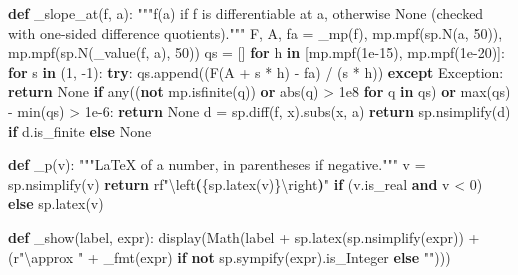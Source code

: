 \documentclass[
  letterpaper,
  DIV=11,
  numbers=noendperiod]{scrreprt}
\newenvironment{Shaded}{\begin{snugshade}}{\end{snugshade}}
\newcommand{\BuiltInTok}[1]{\textcolor[rgb]{0.00,0.23,0.31}{#1}}
\newcommand{\CharTok}[1]{\textcolor[rgb]{0.13,0.47,0.30}{#1}}
\newcommand{\CommentTok}[1]{\textcolor[rgb]{0.37,0.37,0.37}{#1}}
\newcommand{\ControlFlowTok}[1]{\textcolor[rgb]{0.00,0.23,0.31}{\textbf{#1}}}
\newcommand{\DecValTok}[1]{\textcolor[rgb]{0.68,0.00,0.00}{#1}}
\newcommand{\ErrorTok}[1]{\textcolor[rgb]{0.68,0.00,0.00}{#1}}
\newcommand{\FloatTok}[1]{\textcolor[rgb]{0.68,0.00,0.00}{#1}}
\newcommand{\KeywordTok}[1]{\textcolor[rgb]{0.00,0.23,0.31}{\textbf{#1}}}
\newcommand{\NormalTok}[1]{\textcolor[rgb]{0.00,0.23,0.31}{#1}}
\newcommand{\OperatorTok}[1]{\textcolor[rgb]{0.37,0.37,0.37}{#1}}
\newcommand{\PreprocessorTok}[1]{\textcolor[rgb]{0.68,0.00,0.00}{#1}}
\newcommand{\SpecialCharTok}[1]{\textcolor[rgb]{0.37,0.37,0.37}{#1}}
\newcommand{\StringTok}[1]{\textcolor[rgb]{0.13,0.47,0.30}{#1}}
\newcommand{\VariableTok}[1]{\textcolor[rgb]{0.07,0.07,0.07}{#1}}
\newcommand{\VerbatimStringTok}[1]{\textcolor[rgb]{0.13,0.47,0.30}{#1}}
\theoremstyle{plain}
\theoremstyle{plain}
\theoremstyle{definition}
\theoremstyle{definition}
\theoremstyle{definition}
\theoremstyle{plain}
\theoremstyle{plain}
\theoremstyle{remark}
\begin{document}
\begin{Shaded}
\begin{Highlighting}[]
\KeywordTok{def}\NormalTok{ \_slope\_at(f, a):}
    \CommentTok{"""f\textquotesingle{}(a) if f is differentiable at a, otherwise None (checked with one{-}sided difference quotients)."""}
\NormalTok{    F, A, fa }\OperatorTok{=}\NormalTok{ \_mp(f), mp.mpf(sp.N(a, }\DecValTok{50}\NormalTok{)), mp.mpf(sp.N(\_value(f, a), }\DecValTok{50}\NormalTok{))}
\NormalTok{    qs }\OperatorTok{=}\NormalTok{ []}
    \ControlFlowTok{for}\NormalTok{ h }\KeywordTok{in}\NormalTok{ [mp.mpf(}\StringTok{\textquotesingle{}1e{-}15\textquotesingle{}}\NormalTok{), mp.mpf(}\StringTok{\textquotesingle{}1e{-}20\textquotesingle{}}\NormalTok{)]:}
        \ControlFlowTok{for}\NormalTok{ s }\KeywordTok{in}\NormalTok{ (}\DecValTok{1}\NormalTok{, }\OperatorTok{{-}}\DecValTok{1}\NormalTok{):}
            \ControlFlowTok{try}\NormalTok{:}
\NormalTok{                qs.append((F(A }\OperatorTok{+}\NormalTok{ s }\OperatorTok{*}\NormalTok{ h) }\OperatorTok{{-}}\NormalTok{ fa) }\OperatorTok{/}\NormalTok{ (s }\OperatorTok{*}\NormalTok{ h))}
            \ControlFlowTok{except} \PreprocessorTok{Exception}\NormalTok{:}
                \ControlFlowTok{return} \VariableTok{None}
    \ControlFlowTok{if} \BuiltInTok{any}\NormalTok{((}\KeywordTok{not}\NormalTok{ mp.isfinite(q)) }\KeywordTok{or} \BuiltInTok{abs}\NormalTok{(q) }\OperatorTok{\textgreater{}} \FloatTok{1e8} \ControlFlowTok{for}\NormalTok{ q }\KeywordTok{in}\NormalTok{ qs) }\KeywordTok{or} \BuiltInTok{max}\NormalTok{(qs) }\OperatorTok{{-}} \BuiltInTok{min}\NormalTok{(qs) }\OperatorTok{\textgreater{}} \FloatTok{1e{-}6}\NormalTok{:}
        \ControlFlowTok{return} \VariableTok{None}
\NormalTok{    d }\OperatorTok{=}\NormalTok{ sp.diff(f, x).subs(x, a)}
    \ControlFlowTok{return}\NormalTok{ sp.nsimplify(d) }\ControlFlowTok{if}\NormalTok{ d.is\_finite }\ControlFlowTok{else} \VariableTok{None}


\KeywordTok{def}\NormalTok{ \_p(v):}
    \CommentTok{"""LaTeX of a number, in parentheses if negative."""}
\NormalTok{    v }\OperatorTok{=}\NormalTok{ sp.nsimplify(v)}
    \ControlFlowTok{return} \VerbatimStringTok{rf"}\ErrorTok{\textbackslash{}}\VerbatimStringTok{left}\KeywordTok{(}\SpecialCharTok{\{}\NormalTok{sp}\SpecialCharTok{.}\NormalTok{latex(v)}\SpecialCharTok{\}}\CharTok{\textbackslash{}r}\VerbatimStringTok{ight}\KeywordTok{)}\VerbatimStringTok{"} \ControlFlowTok{if}\NormalTok{ (v.is\_real }\KeywordTok{and}\NormalTok{ v }\OperatorTok{\textless{}} \DecValTok{0}\NormalTok{) }\ControlFlowTok{else}\NormalTok{ sp.latex(v)}


\KeywordTok{def}\NormalTok{ \_show(label, expr):}
\NormalTok{    display(Math(label }\OperatorTok{+}\NormalTok{ sp.latex(sp.nsimplify(expr)) }\OperatorTok{+}
\NormalTok{                 (}\VerbatimStringTok{r"}\CharTok{\textbackslash{}a}\VerbatimStringTok{pprox "} \OperatorTok{+}\NormalTok{ \_fmt(expr) }\ControlFlowTok{if} \KeywordTok{not}\NormalTok{ sp.sympify(expr).is\_Integer }\ControlFlowTok{else} \StringTok{""}\NormalTok{)))}



\end{Highlighting}
\end{Shaded}
\end{document}
